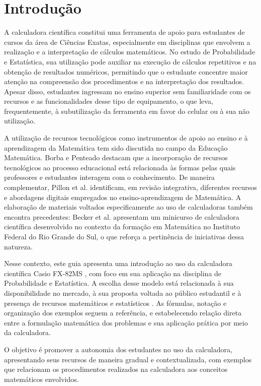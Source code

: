 \chapter{Introdução}

A calculadora científica constitui uma ferramenta de apoio para estudantes de cursos da área de Ciências Exatas, especialmente em disciplinas que envolvem a realização e a interpretação de cálculos matemáticos. No estudo de Probabilidade e Estatística, sua utilização pode auxiliar na execução de cálculos repetitivos e na obtenção de resultados numéricos, permitindo que o estudante concentre maior atenção na compreensão dos procedimentos e na interpretação dos resultados. Apesar disso, estudantes ingressam no ensino superior sem familiaridade com os recursos e as funcionalidades desse tipo de equipamento, o que leva, frequentemente, à subutilização da ferramenta em favor do celular ou à sua não utilização.

A utilização de recursos tecnológicos como instrumentos de apoio ao ensino e à aprendizagem da Matemática tem sido discutida no campo da Educação Matemática. Borba e Penteado \cite{borba2019} destacam que a incorporação de recursos tecnológicos ao processo educacional está relacionada às formas pelas quais professores e estudantes interagem com o conhecimento. De maneira complementar, Pillon et al. \cite{pillon2020} identificam, em revisão integrativa, diferentes recursos e abordagens digitais empregados no ensino-aprendizagem de Matemática. A elaboração de materiais voltados especificamente ao uso de calculadoras também encontra precedentes: Becker et al. \cite{becker2020} apresentam um minicurso de calculadora científica desenvolvido no contexto da formação em Matemática no Instituto Federal do Rio Grande do Sul, o que reforça a pertinência de iniciativas dessa natureza.

Nesse contexto, este guia apresenta uma introdução ao uso da calculadora científica Casio FX-82MS \cite{casio2004}, com foco em sua aplicação na disciplina de Probabilidade e Estatística. A escolha desse modelo está relacionada à sua disponibilidade no mercado, à sua proposta voltada ao público estudantil e à presença de recursos matemáticos e estatísticos \cite{neubert2026}. As fórmulas, notação e organização dos exemplos seguem a referência, e estabelecendo relação direta entre a formulação matemática dos problemas e sua aplicação prática por meio da calculadora.

O objetivo é promover a autonomia dos estudantes no uso da calculadora, apresentando seus recursos de maneira gradual e contextualizada, com exemplos que relacionam os procedimentos realizados na calculadora aos conceitos matemáticos envolvidos.